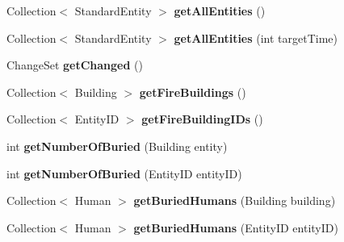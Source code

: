 \begin{DoxyCompactItemize}
\hypertarget{classadf_1_1agent_1_1info_1_1WorldInfo_ad664095242bc87014a9f3a30096d8cf2}{}\label{classadf_1_1agent_1_1info_1_1WorldInfo_ad664095242bc87014a9f3a30096d8cf2} 
Collection$<$ Standard\+Entity $>$ {\bfseries get\+All\+Entities} ()
\item 
\hypertarget{classadf_1_1agent_1_1info_1_1WorldInfo_a43d5ef30f159dae7cac58ca37acc5634}{}\label{classadf_1_1agent_1_1info_1_1WorldInfo_a43d5ef30f159dae7cac58ca37acc5634} 
Collection$<$ Standard\+Entity $>$ {\bfseries get\+All\+Entities} (int target\+Time)
\item 
\hypertarget{classadf_1_1agent_1_1info_1_1WorldInfo_a635e5a4183c37203c14c04a344c6f7e6}{}\label{classadf_1_1agent_1_1info_1_1WorldInfo_a635e5a4183c37203c14c04a344c6f7e6} 
Change\+Set {\bfseries get\+Changed} ()
\item 
\hypertarget{classadf_1_1agent_1_1info_1_1WorldInfo_aefa6fabb5796c3905097fa2838be2080}{}\label{classadf_1_1agent_1_1info_1_1WorldInfo_aefa6fabb5796c3905097fa2838be2080} 
Collection$<$ Building $>$ {\bfseries get\+Fire\+Buildings} ()
\item 
\hypertarget{classadf_1_1agent_1_1info_1_1WorldInfo_a87f85ac87e919080fbfde782c3f4dfa9}{}\label{classadf_1_1agent_1_1info_1_1WorldInfo_a87f85ac87e919080fbfde782c3f4dfa9} 
Collection$<$ Entity\+ID $>$ {\bfseries get\+Fire\+Building\+I\+Ds} ()
\item 
\hypertarget{classadf_1_1agent_1_1info_1_1WorldInfo_aa1447b4273d1c54bd287ecb544da3c80}{}\label{classadf_1_1agent_1_1info_1_1WorldInfo_aa1447b4273d1c54bd287ecb544da3c80} 
int {\bfseries get\+Number\+Of\+Buried} (Building entity)
\item 
\hypertarget{classadf_1_1agent_1_1info_1_1WorldInfo_ab25146f85a6a6847dddf16c12879f42f}{}\label{classadf_1_1agent_1_1info_1_1WorldInfo_ab25146f85a6a6847dddf16c12879f42f} 
int {\bfseries get\+Number\+Of\+Buried} (Entity\+ID entity\+ID)
\item 
\hypertarget{classadf_1_1agent_1_1info_1_1WorldInfo_a4f7937a4cf7da262e68ed94863dd3efd}{}\label{classadf_1_1agent_1_1info_1_1WorldInfo_a4f7937a4cf7da262e68ed94863dd3efd} 
Collection$<$ Human $>$ {\bfseries get\+Buried\+Humans} (Building building)
\item 
\hypertarget{classadf_1_1agent_1_1info_1_1WorldInfo_a12019dd2f17548d54bc368628967b96c}{}\label{classadf_1_1agent_1_1info_1_1WorldInfo_a12019dd2f17548d54bc368628967b96c} 
Collection$<$ Human $>$ {\bfseries get\+Buried\+Humans} (Entity\+ID entity\+ID)
\item 
\hypertarget{classadf_1_1agent_1_1info_1_1WorldInfo_a625ca3a194ebb85796b3f9ad1d871220}{}\label{classadf_1_1agent_1_1info_1_1WorldInfo_a625ca3a194ebb85796b3f9ad1d871220} 

\end{DoxyCompactItemize}
